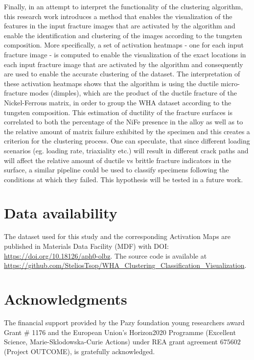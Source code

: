 \documentclass[authoryear,preprint,review,12pt, singleside]{elsarticle}
\begin{document}
Finally, in an attempt to interpret the functionality of the clustering algorithm, this research work introduces a method that enables the visualization of the features in the input fracture images that are activated by the algorithm and enable the identification and clustering of the images according to the tungsten composition. More specifically, a set of activation heatmaps - one for each input fracture image - is computed to enable the visualization of the exact locations in each input fracture image that are activated by the algorithm and consequently are used to enable the accurate clustering of the dataset. The interpretation of these activation heatmaps shows that the algorithm is using the ductile micro-fracture modes (dimples), which are the product of the ductile fracture of the Nickel-Ferrous matrix, in order to group the WHA dataset according to the tungsten composition. This estimation of ductility of the fracture surfaces is correlated to both the percentage of the NiFe presence in the alloy as well as to the relative amount of matrix failure exhibited by the specimen and this creates a criterion for the clustering process.  One can speculate, that since different loading scenarios (eg. loading rate, triaxiality etc.) will result in different crack paths and will affect the relative amount of ductile vs brittle fracture indicators in the surface, a similar pipeline could be used to classify specimens following the conditions at which they failed. This hypothesis will be tested in a future work.   
 

\section*{Data availability} The  dataset used for this study and the corresponding Activation Maps are published in Materials Data Facility (MDF) with DOI: \url{https://doi.org/10.18126/aph0-olbz}. The source code is available at \url{https://github.com/SteliosTsop/WHA_Clustering_Classification_Visualization}.  

\section*{Acknowledgments}
	The financial support provided by the Pazy foundation young researchers award Grant $\#$ 1176  and the European Union's Horizon2020 Programme (Excellent Science, Marie-Sklodowska-Curie Actions) under REA grant agreement $675602$ (Project OUTCOME), is gratefully acknowledged. 




\clearpage



\end{document}
